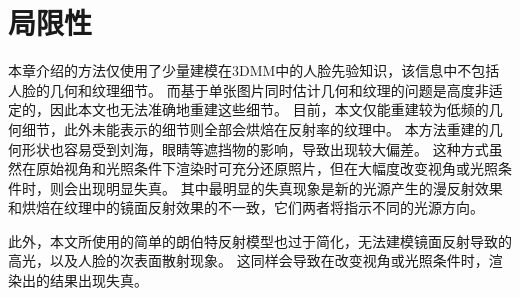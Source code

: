 \section{局限性}

本章介绍的方法仅使用了少量建模在3DMM中的人脸先验知识，该信息中不包括人脸的几何和纹理细节。
而基于单张图片同时估计几何和纹理的问题是高度非适定的，因此本文也无法准确地重建这些细节。
目前，本文仅能重建较为低频的几何细节，此外未能表示的细节则全部会烘焙在反射率的纹理中。
本方法重建的几何形状也容易受到刘海，眼睛等遮挡物的影响，导致出现较大偏差。
这种方式虽然在原始视角和光照条件下渲染时可充分还原照片，但在大幅度改变视角或光照条件时，则会出现明显失真。
其中最明显的失真现象是新的光源产生的漫反射效果和烘焙在纹理中的镜面反射效果的不一致，它们两者将指示不同的光源方向。

此外，本文所使用的简单的朗伯特反射模型也过于简化，无法建模镜面反射导致的高光，以及人脸的次表面散射现象。
这同样会导致在改变视角或光照条件时，渲染出的结果出现失真。
